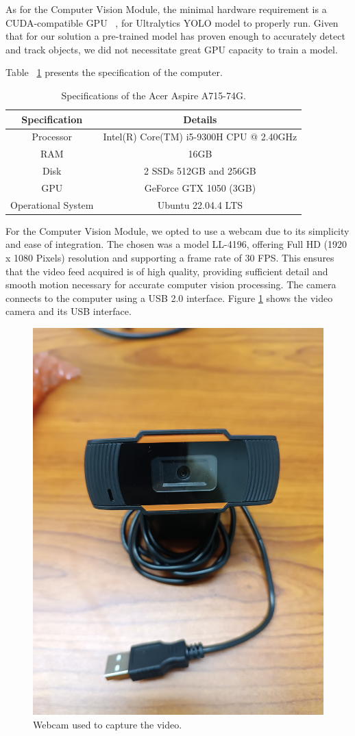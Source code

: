 As for the Computer Vision Module, the minimal hardware requirement is a CUDA-compatible GPU ~\cite{ultralytics_faq}, for Ultralytics YOLO model to properly run.
Given that for our solution a pre-trained model has proven enough to accurately detect and track objects, we did not necessitate great GPU capacity to train a model.

Table ~\ref{tab:specs_pc} presents the specification of the computer.

\begin{table}[H]
    \caption{Specifications of the Acer Aspire A715-74G.}
    \label{tab:specs_pc}
    \begin{tabular}{|c|c|}
        \hline
        \textbf{Specification} & \textbf{Details} \\ \hline
        Processor                      &           Intel(R) Core(TM) i5-9300H CPU @ 2.40GHz   \\ \hline
        RAM                      &          16GB        \\ \hline
        Disk                      &   2 SSDs  512GB and 256GB         \\ \hline
        GPU                     &   GeForce GTX 1050 (3GB)      \\ \hline
        Operational System & Ubuntu 22.04.4 LTS                  \\ \hline
    \end{tabular}
\end{table}

For the Computer Vision Module, we opted to use a webcam due to its simplicity and ease of integration.
The chosen was a model LL-4196, offering Full HD (1920 x 1080 Pixels) resolution and supporting a frame rate of 30 FPS\@.
This ensures that the video feed acquired is of high quality, providing sufficient detail and smooth motion necessary for accurate computer vision processing.
The camera connects to the computer using a USB 2.0 interface.
Figure \ref{fig:camera} shows the video camera and its USB interface.

\begin{figure}[H]
    \centering
    \includegraphics[width=0.3\linewidth]{figures/webcam}
    \caption{Webcam used to capture the video.}
    \label{fig:camera}
\end{figure}

